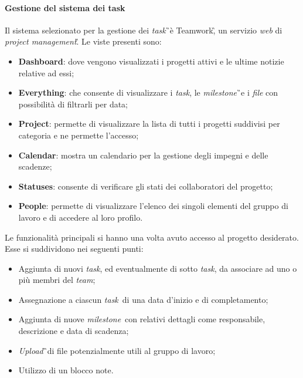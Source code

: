 \paragraph{Gestione del sistema dei task} Il sistema selezionato per la gestione dei \textit{task}\G\ è Teamwork\G, un servizio \textit{web} di \textit{project management}\G. Le viste presenti sono:
\begin{itemize}
\item \textbf{Dashboard}: dove vengono visualizzati i progetti attivi e le ultime notizie relative ad essi;

\item \textbf{Everything}: che consente di visualizzare i \textit{task}, le \textit{milestone}\G\ e i \textit{file} con possibilità di filtrarli per data;

\item \textbf{Project}: permette di visualizzare la lista di tutti i progetti suddivisi per categoria e ne permette l'accesso;

\item \textbf{Calendar}: mostra un calendario per la gestione degli impegni e delle scadenze;

\item \textbf{Statuses}: consente di verificare gli stati dei collaboratori del progetto;

\item \textbf{People}: permette di visualizzare l'elenco dei singoli elementi del gruppo di lavoro e di accedere al loro profilo.    
\end{itemize}

Le funzionalità principali si hanno una volta avuto accesso al progetto desiderato. Esse si suddividono nei seguenti punti:
\begin{itemize}
\item Aggiunta di nuovi \textit{task}, ed eventualmente di sotto \textit{task}, da associare ad uno o più membri del \textit{team};

\item Assegnazione a ciascun \textit{task}\ di una data d'inizio e di completamento;

\item Aggiunta di nuove \textit{milestone}\ con relativi dettagli come responsabile, descrizione e data di scadenza;

\item \textit{Upload}\G\ di file potenzialmente utili al gruppo di lavoro;

\item Utilizzo di un blocco note.
 
\end{itemize}

